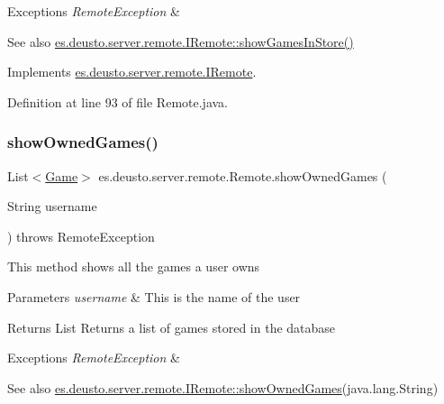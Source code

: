 \begin{DoxyExceptions}{Exceptions}
{\em Remote\+Exception} & \\
\hline
\end{DoxyExceptions}
\begin{DoxySeeAlso}{See also}
\hyperlink{interfacees_1_1deusto_1_1server_1_1remote_1_1_i_remote_a091249da31b567c1be29e07085d3ff18}{es.\+deusto.\+server.\+remote.\+I\+Remote\+::show\+Games\+In\+Store()} 
\end{DoxySeeAlso}


Implements \hyperlink{interfacees_1_1deusto_1_1server_1_1remote_1_1_i_remote_a091249da31b567c1be29e07085d3ff18}{es.\+deusto.\+server.\+remote.\+I\+Remote}.



Definition at line 93 of file Remote.\+java.

\mbox{\label{classes_1_1deusto_1_1server_1_1remote_1_1_remote_a73569877f9317fc48a4e134977baa304}} 
\subsubsection{\texorpdfstring{show\+Owned\+Games()}{showOwnedGames()}}
{\footnotesize\ttfamily List$<$\hyperlink{classes_1_1deusto_1_1server_1_1db_1_1data_1_1_game}{Game}$>$ es.\+deusto.\+server.\+remote.\+Remote.\+show\+Owned\+Games (\begin{DoxyParamCaption}\item[{String}]{username }\end{DoxyParamCaption}) throws Remote\+Exception}

This method shows all the games a user owns 
\begin{DoxyParams}{Parameters}
{\em username} & This is the name of the user \\
\hline
\end{DoxyParams}
\begin{DoxyReturn}{Returns}
List Returns a list of games stored in the database 
\end{DoxyReturn}

\begin{DoxyExceptions}{Exceptions}
{\em Remote\+Exception} & \\
\hline
\end{DoxyExceptions}
\begin{DoxySeeAlso}{See also}
\hyperlink{interfacees_1_1deusto_1_1server_1_1remote_1_1_i_remote_aaaf6af5906c81cbd7b3b190a70ead98b}{es.\+deusto.\+server.\+remote.\+I\+Remote\+::show\+Owned\+Games}(java.\+lang.\+String) 
\end{DoxySeeAlso}


